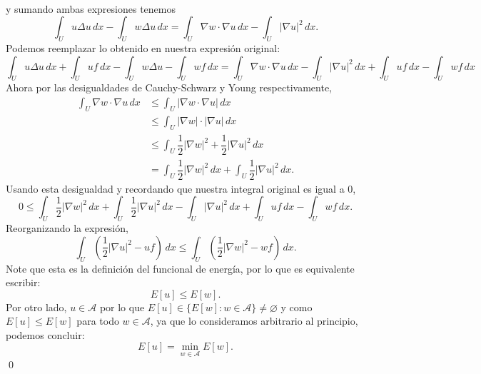\documentclass{article}
\begin{document}
\begin{solucion}
\begin{align*}
    \end{align*}
    y sumando ambas expresiones tenemos
    $$\int_U u\Delta u\,dx-\int_U w\Delta u\,dx=\int_U\nabla w\cdot\nabla u\,dx-\int_U|\nabla u|^2\,dx.$$
    Podemos reemplazar lo obtenido en nuestra expresión original:
    $$\int_Uu\Delta u\,dx+\int_U uf\,dx-\int_Uw\Delta u-\int_U wf\,dx=\int_U\nabla w\cdot\nabla u\,dx-\int_U|\nabla u|^2\,dx+\int_U uf\,dx-\int_U wf\,dx$$
    Ahora por las desigualdades de Cauchy-Schwarz y Young respectivamente,
    \begin{align*}
        \int_U\nabla w\cdot\nabla u\,dx&\leq\int_U|\nabla w\cdot\nabla u|\,dx\\
        &\leq\int_U|\nabla w|\cdot|\nabla u|\,dx\\
        &\leq\int_U\dfrac{1}{2}|\nabla w|^2+\dfrac{1}{2}|\nabla u|^2\,dx\\
        &=\int_U\dfrac{1}{2}|\nabla w|^2\,dx+\int_U\dfrac{1}{2}|\nabla u|^2\,dx.
    \end{align*}
    Usando esta desigualdad y recordando que nuestra integral original es igual a 0,
    $$0\leq\int_U\dfrac{1}{2}|\nabla w|^2\,dx+\int_U\dfrac{1}{2}|\nabla u|^2\,dx-\int_U|\nabla u|^2\,dx+\int_U uf\,dx-\int_U wf\,dx.$$
    Reorganizando la expresión,
    $$\int_U\left(\dfrac{1}{2}|\nabla u|^2-uf\right)\,dx\leq\int_U\left(\dfrac{1}{2}|\nabla w|^2-wf\right)\,dx.$$
    Note que esta es la definición del funcional de energía, por lo que es equivalente escribir:
    $$E[u]\leq E[w].$$
    Por otro lado, $u\in\mathcal{A}$ por lo que $E[u]\in\{E[w]:w\in\mathcal{A}\}\neq\varnothing$ y como $E[u]\leq E[w]$ para todo $w\in\mathcal{A}$, ya que lo consideramos arbitrario al principio, podemos concluir:
    $$E[u]=\min_{w\in\mathcal{A}}E[w].$$
    \qed
\end{solucion}
\end{document}
